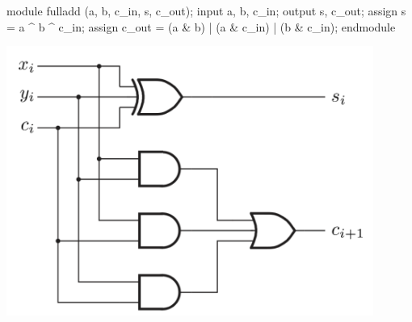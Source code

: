 \documentclass[12pt,openany]{book}
\begin{document}
\begin{minipage}[htp]{0.45\textwidth}	
	\begin{vhdl}
module fulladd (a, b, c_in, s, c_out);
	input a, b, c_in;
	output s, c_out;
	assign s = a ^ b ^ c_in;
	assign c_out = (a & b) | (a & c_in) | (b & c_in);
endmodule
	\end{vhdl}
\end{minipage}
\hfill
\vline
\hfill
\begin{minipage}[htp]{0.45\textwidth}
	\begin{center}
		\includegraphics[width=0.9\textwidth]{circuits/8.4.2.png}
	\end{center}	
\end{minipage}
\end{document}
